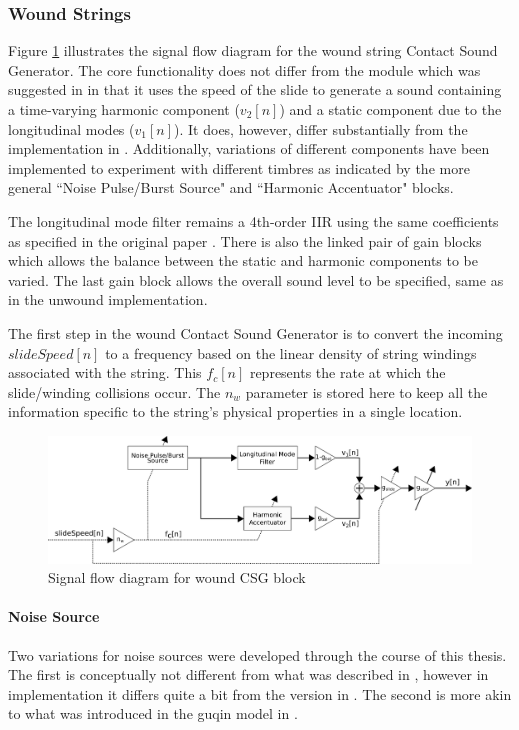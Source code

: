 \documentclass[../main.tex]{subfiles}
\begin{document}
\subsubsection{Wound Strings}
Figure \ref{fig:CSG_wound} illustrates the signal flow diagram for the wound string Contact Sound Generator. The core functionality does not differ from the module which was suggested in  in that it uses the speed of the slide to generate a sound containing a time-varying harmonic component ($v_2[n]$) and a static component due to the longitudinal modes ($v_1[n]$). It does, however,  differ substantially from the implementation in . Additionally, variations of different components have been implemented to experiment with different timbres as indicated by the more general ``Noise Pulse/Burst Source" and ``Harmonic Accentuator" blocks.

The longitudinal mode filter remains a 4th-order IIR using the same coefficients as specified in the original paper . There is also the linked pair of gain blocks which allows the balance between the static and harmonic components to be varied. The last gain block allows the overall sound level to be specified, same as in the unwound implementation.

The first step in the wound Contact Sound Generator is to convert the incoming $slideSpeed[n]$ to a frequency based on the linear density of string windings associated with the string. This $f_c[n]$ represents the rate at which the slide/winding collisions occur. The $n_w$ parameter is stored here to keep all the information specific to the string's physical properties in a single location.

\begin{figure}[h]
    \centering
    \includegraphics[scale=.5]{./images/diagrams/CSG_wound.png}
    \caption{Signal flow diagram for wound CSG block}
    \label{fig:CSG_wound}
\end{figure}

\paragraph{Noise Source}
Two variations for noise sources were developed through the course of this thesis. The first is conceptually not different from what was described in , however in implementation it differs quite a bit from the version in . The second is more akin to what was introduced in  the guqin model in .
\end{document}
